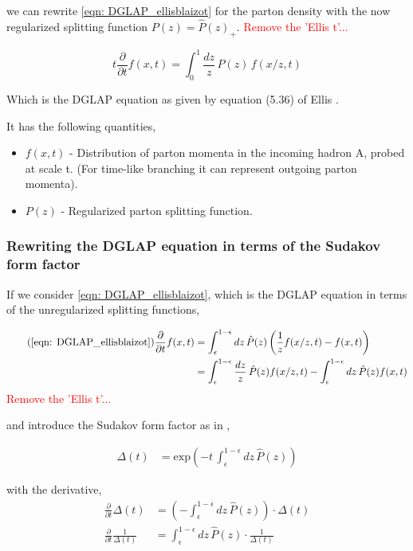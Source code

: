 \documentclass[main.tex]{subfiles}
\begin{document}
we can rewrite \autoref{eqn: DGLAP_ellisblaizot} for the parton density with the now regularized splitting function \(P(z) = \hat P(z)_+\). \textcolor{red}{Remove the 'Ellis t'...}

\begin{equation}\label{eqn: dglap_ellis_style}
    t \frac{\partial }{\partial t} f(x,t) = \int_0^1 \frac{dz}{z} \, P(z) \, f(x/z, t)
\end{equation}

Which is the DGLAP equation as given by equation (5.36) of Ellis \cite{ellis_stirling_webber_1996}.

It has the following quantities, 

\begin{itemize}
    \item \(f(x,t)\) - Distribution of parton momenta in the incoming hadron A, probed at scale t. (For time-like branching it can represent outgoing parton momenta).
    \item \(P(z)\) - Regularized parton splitting function.
\end{itemize}


\subsubsection{Rewriting the DGLAP equation in terms of the Sudakov form factor}
If we consider \autoref{eqn: DGLAP_ellisblaizot}, which is the DGLAP equation in terms of the unregularized splitting functions, %

\begin{align}\tag{\ref{eqn: DGLAP_ellisblaizot}}
    \frac{\partial}{\partial t} f(x,t) &= \int_{\epsilon}^{1-\epsilon} dz \, \hat{P}(z) \left( \frac{1}{z} f(x/z ,t) - f(x,t) \right) \nonumber \\
    &= \int_{\epsilon}^{1-\epsilon} \frac{dz}{z} \, \hat{P}(z) f(x/z ,t) - \int_{\epsilon}^{1-\epsilon} dz \, \hat{P}(z) f(x,t)
\end{align}
\textcolor{red}{Remove the 'Ellis t'...}

and introduce the Sudakov form factor as in \cite{Dasgupta_2015},

\begin{align}\label{eqn: sudakov_form_factor_dasguptalike}
    \Delta (t) &= \text{exp}\left(-t\, \int_{\epsilon}^{1-\epsilon}dz \, \hat P(z)\right) 
\end{align}

with the derivative,
\begin{align}
    \frac{\partial}{\partial t} \Delta (t) &= (- \int_{\epsilon}^{1-\epsilon} dz\, \hat P(z) )\cdot  \Delta(t) \nonumber\\
    \frac{\partial}{\partial t} \frac{1}{\Delta(t)}&= \int_{\epsilon}^{1-\epsilon} dz\, \hat P(z) \cdot  \frac{1}{\Delta(t)}
\end{align}
\end{document}
